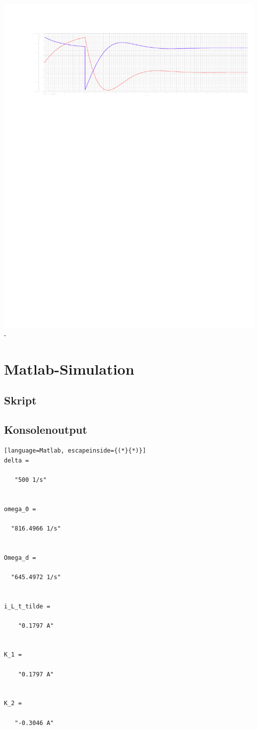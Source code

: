 \documentclass[11pt]{scrartcl}
\begin{document}
  \hspace{-2cm}
  \includegraphics[width=1.25\linewidth]{./Assets/PS_doppel_plot.pdf}
  \label{fig:ML_Strom_Plot}
-

\section{Matlab-Simulation}
\subsection{Skript}


\subsection{Konsolenoutput}
\begin{lstlisting}[language=Matlab, escapeinside={(*}{*)}]
delta =

   "500 1/s"


omega_0 =

  "816.4966 1/s"


Omega_d =

  "645.4972 1/s"


i_L_t_tilde =

    "0.1797 A"


K_1 =

    "0.1797 A"


K_2 =

   "-0.3046 A"
\end{lstlisting}
\end{document}
